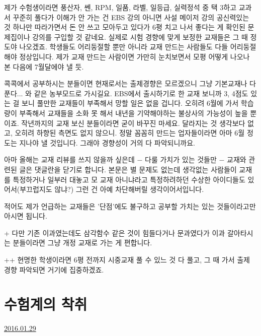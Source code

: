 제가 수험생이라면
풍산자, 쎈, RPM, 일품, 라벨, 일등급, 실력정석 중 택 3하고 교과서 꾸준히 풀다가
이해가 안 가는 건 EBS 강의 아니면 사설 메이저 강의 공신력있는 것 하나만 따라가면서
돈 안 쓰고 모아두고 있다가 6평 치고 나서 좋다는 게 확인된 문제집이나 강의를 구입할 것 같네요.
실제로 시험 경향에 맞게 보정한 교재들은 그 때 정도야 나오겠죠.
학생들도 어리둥절할 뿐만 아니라 교재 만드는 사람들도 다들 어리둥절해야 정상입니다.
제가 교재 만드는 사람이면 가만히 눈치보면서 모평 어떻게 나오나 본 다음에 7월달에야 낼 듯.
\vspace{5mm}

콕콕에서 공부하시는 분들이면 현재로서는 출제경향은 모르겠으니 그냥 기본교재나 다 푼다... 와 같은 농부모드로 가시길요.
EBS에서 출시하기로 한 교재 보니까 3, 4점도 있는 걸 보니 풀만한 교재들이 부족해서 망할 일은 없을 겁니다.
오히려 6월에 가서 학습량이 부족해서 교재들을 소화 못 해서 내년을 기약해야하는 불상사의 가능성이 높을 뿐이죠.
작년까지의 교재 보신 분들이라면 굳이 바꾸진 마세요. 달라지는 것 생각보다 없고, 오히려 하향된 측면도 없지 않으니.
정말 꼼꼼히 만드는 업자들이라면 아마 6월 정도는 지나야 낼 것입니다. 그래야 경향성이 거의 다 파악되니까요.
\vspace{5mm}

아마 올해는 교재 리뷰를 쓰지 않을까 싶은데 $-$ 다룰 가치가 있는 것들만 $-$
교재와 관련된 글은 댓글란을 닫기로 합니다.
본문은 별 문제도 없는데 생각없는 사람들이 교재를 특정하거나
일부러 대놓고 모 교재 아니냐라고 특정하려하던 수상한 아이디들도 있어서(부끄럽지도 않냐?)
그런 건 아예 차단해버릴 생각이어서입니다.
\vspace{5mm}

적어도 제가 언급하는 교재들은 '단점'에도 불구하고 공부할 가치는 있는 것들이라고만 아시면 됩니다.
\vspace{5mm}

+ 다만 기존 이과였는데도 삼각함수 같은 것이 힘들다거나  문과였다가 이과 갈아타시는 분들이라면 그냥 개정 교재로 가는 게 편합니다.
\vspace{5mm}

++ 현명한 학생이라면 6평 전까지 시중교재 풀 수 있느 것 다 풀고, 그 때 가서 출제 경향 파악되면 거기에 집중하겠죠.
\vspace{5mm}








\section{수험계의 착취}
\href{https://www.kockoc.com/Apoc/615234}{2016.01.29}

